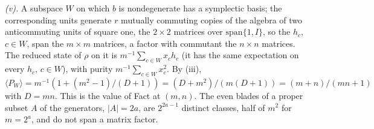 \emph{(v).} A subspace $W$ on which $b$ is nondegenerate has a symplectic basis; the corresponding units generate $r$ mutually commuting copies of the algebra of two anticommuting units of square one, the $2\times2$ matrices over $\mathrm{span}\{1, I\}$, so the $h_{c}$, $c \in W$, span the $m\times m$ matrices, a factor with commutant the $n\times n$ matrices. The reduced state of $\rho$ on it is $m^{-1}\sum_{c\in W}x_{c}h_{c}$ (it has the same expectation on every $h_{c}$, $c \in W$), with purity $m^{-1}\sum_{c\in W}x_{c}^{2}$. By (iii), $\langle P_{W}\rangle = m^{-1}(1 + (m^{2} - 1)/(D + 1)) = (D + m^{2})/(m(D + 1)) = (m + n)/(mn + 1)$ with $D = mn$. This is the value of Fact  at $(m, n)$. The even blades of a proper subset $A$ of the generators, $|A| = 2a$, are $2^{2a-1}$ distinct classes, half of $m^{2}$ for $m = 2^{a}$, and do not span a matrix factor.
